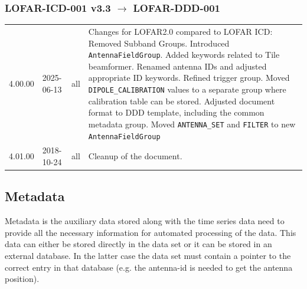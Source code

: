 \documentclass[a4paper,10pt,bibtotoc]{scrartcl}
\begin{document}
\subsubsection*{LOFAR-ICD-001 v3.3 $\rightarrow$ LOFAR-DDD-001}

\begin{center}
  \tablelasttail{\hline}
  \begin{supertabular}{lllp{9.5cm}}
    4.00.00 & 2025-06-13 & all   & Changes for LOFAR2.0 compared to LOFAR ICD: Removed Subband Groups. Introduced \texttt{AntennaFieldGroup}. Added keywords related to Tile beamformer. Renamed antenna IDs and adjusted appropriate ID keywords. Refined trigger group.   Moved \texttt{DIPOLE\_CALIBRATION} values to a separate group where calibration table can be stored. Adjusted document format to DDD template, including the common metadata group. Moved \texttt{ANTENNA\_SET} and \texttt{FILTER} to new \texttt{AntennaFieldGroup} \\
    4.01.00 & 2018-10-24 & all   & Cleanup of the document. \\
 \end{supertabular}
\end{center}


\subsection{Metadata}
\label{sec:metadata}

Metadata is the auxiliary data stored along with the time series data need to
provide all the necessary information for automated processing of the data.
This data can either be stored directly in the data set or it can be stored
in an external database. In the latter case the data set must contain a
pointer to the correct entry in that database (e.g. the antenna-id is needed
to get the antenna position).
\end{document}
